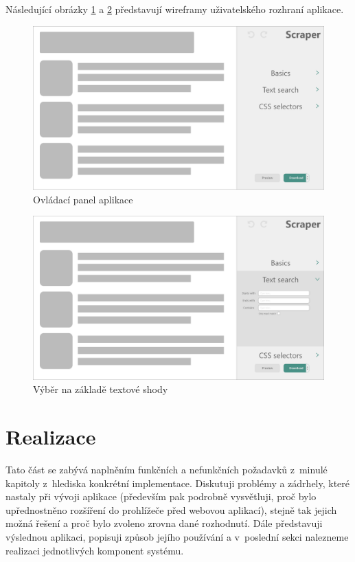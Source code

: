 \documentclass[thesis=B,czech]{FITthesis}[2012/06/26]
\begin{document}
Následující obrázky \ref{fig:scraper_main_wireframe} a \ref{fig:scraper_text_search_wireframe} představují wireframy uživatelského rozhraní aplikace.
\begin{figure}[h]
	\includegraphics[width=\linewidth]{images/main_wireframe.png}
	\caption{Ovládací panel aplikace}
	\label{fig:scraper_main_wireframe}
\end{figure}
\begin{figure}
	\includegraphics[width=\linewidth]{images/text_search_wireframe.png}
	\caption{Výběr na základě textové shody}
	\label{fig:scraper_text_search_wireframe}
\end{figure}



\chapter{Realizace}
Tato část se zabývá naplněním funkčních a nefunkčních požadavků z~minulé kapitoly z~hlediska konkrétní implementace. Diskutuji problémy a zádrhely, které nastaly při vývoji aplikace (především pak podrobně vysvětluji, proč bylo upřednostněno rozšíření do prohlížeče před webovou aplikací), stejně tak jejich možná řešení a proč bylo zvoleno zrovna dané rozhodnutí. Dále představuji výslednou aplikaci, popisuji způsob jejího používání a v~poslední sekci nalezneme realizaci jednotlivých komponent systému.
\end{document}
